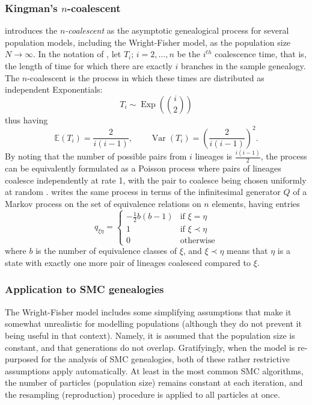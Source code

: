 \documentclass{article}
\newcommand{\E}{\mathbb{E}}
\newcommand{\V}{\operatorname{Var}}
\begin{document}
\subsubsection{Kingman's $n$-coalescent}
\citet{kingman1982gene} introduces the \emph{$n$-coalescent} as the asymptotic genealogical process for several population models, including the Wright-Fisher model, as the population size $N\to\infty$.
In the notation of \citet{wakeley2009}, let $T_i;\, i=2,\dots,n$ be the $i^{th}$ coalescence time, that is, the length of time for which there are exactly $i$ branches in the sample genealogy. The $n$-coalescent is the process in which these times are distributed as independent Exponentials:
\begin{equation*}
T_i \sim \operatorname{Exp}\left(\binom{i}{2}\right)
\end{equation*}
thus having
\begin{equation*}
\E(T_i) = \frac{2}{i(i-1)}, \qquad \V(T_i) = \left( \frac{2}{i(i-1)} \right)^2.
\end{equation*}
By noting that the number of possible pairs from $i$ lineages is $\frac{i(i-1)}{2}$, the process can be equivalently formulated as a Poisson process where pairs of lineages coalesce independently at rate 1, with the pair to coalesce being chosen uniformly at random \citep[Section 3.2]{wakeley2009}.
\citet{mohle1998} writes the same process in terms of the infinitesimal generator $Q$ of a Markov process on the set of equivalence relations on $n$ elements, having entries
\begin{equation*}
q_{\xi\eta} =
\begin{cases}
-\frac{1}{2}b(b-1) &\text{if }\xi=\eta \\
1 & \text{if }\xi \prec\eta \\
0 & \text{otherwise}
\end{cases}
\end{equation*}
where $b$ is the number of equivalence classes of $\xi$, and $\xi \prec \eta$ means that $\eta$ is a state with exactly one more pair of lineages coalesced compared to $\xi$.
 
\subsubsection{Application to SMC genealogies}
The Wright-Fisher model includes some simplifying assumptions that make it somewhat unrealistic for modelling populations (although they do not prevent it being useful in that context). Namely, it is assumed that the population size is constant, and that generations do not overlap. 
Gratifyingly, when the model is re-purposed for the analysis of SMC genealogies, both of these rather restrictive assumptions apply automatically. At least in the most common SMC algorithms, the number of particles (population size) remains constant at each iteration, and the resampling (reproduction) procedure is applied to all particles at once.
\end{document}
